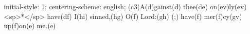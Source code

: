 initial-style: 1;
centering-scheme: english;
(c3)A(d)gainst(d) thee(de) on(ev)ly(ev) <sp>*</sp> have(df) I(hi) sinned,(hg) O(f) Lord:(gh) (;) have(f) mer(f)cy(gv) up(f)on(e) me.(e)
